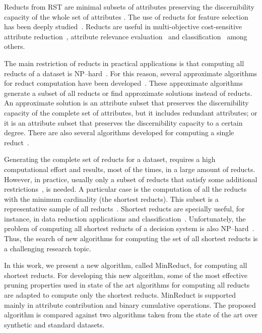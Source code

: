 \documentclass[authoryear,preprint,review,12pt]{elsarticle}
\begin{document}
  Reducts from RST are minimal subsets of attributes preserving the discernibility capacity of the whole set of attributes \citep{Pawlak91}. The use of reducts for feature selection has been deeply studied~\citep{Chen11,Nguyen2016,Alwesabi2016}. Reducts are useful in multi-objective cost-sensitive attribute reduction~\citep{Xu2013,Song2017}, attribute relevance evaluation~\citep{Inuiguchi2017} and classification~\citep{Ishii2018,Own2015} among others.
  
  The main restriction of reducts in practical applications is that computing all reducts of a dataset is NP--hard~\citep{Skowron92}. For this reason, several approximate algorithms for reduct computation have been developed~\citep{Chen10,Chen15,Chen2015a}. These approximate algorithms generate a subset of all reducts or find approximate solutions instead of reducts. An approximate solution is an attribute subset that preserves the discernibility capacity of the complete set of attributes, but it includes redundant attributes; or it is an attribute subset that preserves the discernibility capacity to a certain degree. There are also several algorithms developed for computing a single reduct~\citep{Yang08, ZHOU2014,Jensen14,Jiang15}.
  
  Generating the complete set of reducts for a dataset, requires a high computational effort and results, most of the times, in a large amount of reducts. However, in practice, usually only a subset of reducts that satisfy some additional restrictions~\citep{Jiang15}, is needed. A particular case is the computation of all the reducts with the minimum cardinality (the shortest reducts). This subset is a representative sample of all reducts~\citep{Susmaga}. Shortest reducts are specially useful, for instance, in data reduction applications and classification~\citep{Zhou2009}. Unfortunately, the problem of computing all shortest reducts of a decision system is also NP--hard~\citep{Skowron92}. Thus, the search of new algorithms for computing the set of all shortest reducts is a challenging research topic.
  
   
  In this work, we present a new algorithm, called MinReduct, for computing all shortest reducts. For developing this new algorithm, some of the most effective pruning properties used in state of the art algorithms for computing all reducts~\citep{Sanchez10,Lias13,Rodriguez2018} are adapted to compute only the shortest reducts. MinReduct is supported mainly in attribute contribution and binary cumulative operations. The proposed algorithm is compared against two algorithms taken from the state of the art over synthetic and standard datasets. 
  
\end{document}
